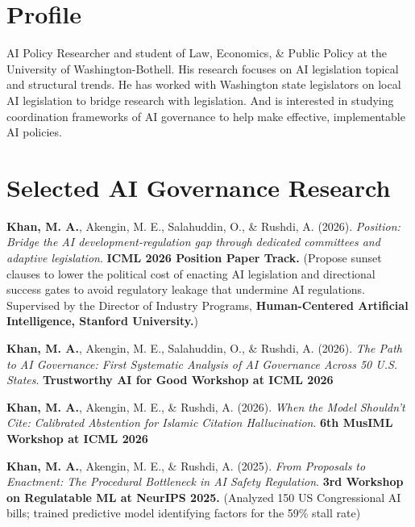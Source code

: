 \documentclass[11pt,a4paper,sans]{moderncv}
\begin{document}
\hfill
\begin{minipage}[t]{0.70\textwidth}
\RaggedRight

\section{Profile}

AI Policy Researcher and student of Law, Economics, \& Public Policy at the University of Washington-Bothell. His research focuses on AI legislation topical and structural trends. He has worked with Washington state legislators on local AI legislation to bridge research with legislation. And is interested in studying coordination frameworks of AI governance to help make effective, implementable AI policies.
\vspace{1mm}

\section{Selected AI Governance Research}
\textbf{Khan, M. A.}, Akengin, M. E., Salahuddin, O., \& Rushdi, A. (2026).
\textit{Position: Bridge the AI development-regulation gap through dedicated committees and adaptive legislation}.
\textbf{ICML 2026 Position Paper Track.}
(Propose sunset clauses to lower the political cost of enacting AI legislation and directional success gates to avoid regulatory leakage that undermine AI regulations. Supervised by the Director of Industry Programs, \textbf{Human-Centered Artificial Intelligence, Stanford University.})
\vspace{2mm}
\vspace{1mm}

\textbf{Khan, M. A.}, Akengin, M. E., Salahuddin, O., \& Rushdi, A. (2026).
\textit{The Path to AI Governance: First Systematic Analysis of AI Governance Across 50 U.S. States}.
\textbf{Trustworthy AI for Good Workshop at ICML 2026}
\vspace{2mm}
\vspace{1mm}

\textbf{Khan, M. A.}, Akengin, M. E., \& Rushdi, A. (2026).
\textit{When the Model Shouldn't Cite: Calibrated Abstention for Islamic Citation Hallucination}.
\textbf{6th MusIML Workshop at ICML 2026}
\vspace{2mm}
\vspace{1mm}

\textbf{Khan, M. A.}, Akengin, M. E., \& Rushdi, A. (2025). 
\textit{From Proposals to Enactment: The Procedural Bottleneck in AI Safety Regulation}. 
\textbf{3rd Workshop on Regulatable ML at NeurIPS 2025.} 
(Analyzed 150 US Congressional AI bills; trained predictive model identifying factors for the 59\% stall rate)
\vspace{2mm}
\vspace{1mm}


\end{minipage}
\end{document}
